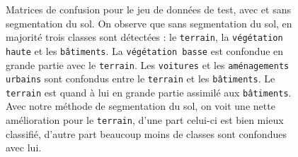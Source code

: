 \documentclass[a4paper, onecolumn, 11pt]{article}
\begin{document}
\begin{figure}[p]
    \centering
    \qquad
    \caption{Matrices de confusion pour le jeu de données de test, avec et sans segmentation du sol. On observe que sans segmentation du sol, en majorité trois classes sont détectées : le \texttt{terrain}, la \texttt{végétation haute} et les \texttt{bâtiments}. La \texttt{végétation basse} est confondue en grande partie avec le \texttt{terrain}. Les \texttt{voitures} et les \texttt{aménagements urbains} sont confondus entre le \texttt{terrain} et les \texttt{bâtiments}. Le \texttt{terrain} est quand à lui en grande partie assimilé aux \texttt{bâtiments}. Avec notre méthode de segmentation du sol, on voit une nette amélioration pour le \texttt{terrain}, d'une part celui-ci est bien mieux classifié, d'autre part beaucoup moins de classes sont confondues avec lui.}
    \label{fig:ground}
\end{figure}
\end{document}
